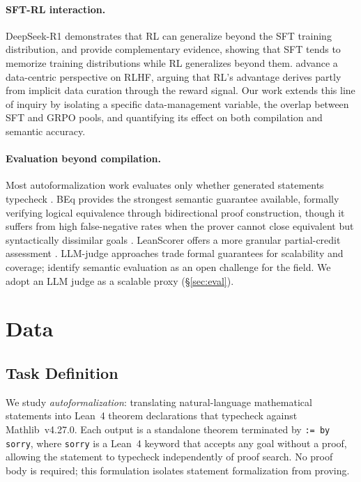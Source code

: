 \documentclass[11pt,a4paper]{article}
\begin{document}
\paragraph{SFT-RL interaction.}
DeepSeek-R1 \citep{guo2025deepseekr1} demonstrates that RL can generalize beyond the SFT training distribution, and \citet{chu2025sftmemorizes} provide complementary evidence, showing that SFT tends to memorize training distributions while RL generalizes beyond them. \citet{lu2026datacentric} advance a data-centric perspective on RLHF, arguing that RL's advantage derives partly from implicit data curation through the reward signal. Our work extends this line of inquiry by isolating a specific data-management variable, the overlap between SFT and GRPO pools, and quantifying its effect on both compilation and semantic accuracy.

\paragraph{Evaluation beyond compilation.}
Most autoformalization work evaluates only whether generated statements typecheck \citep{wang2025kimina, huang2025formalrl}. BEq provides the strongest semantic guarantee available, formally verifying logical equivalence through bidirectional proof construction, though it suffers from high false-negative rates when the prover cannot close equivalent but syntactically dissimilar goals \citep{wu2025stepfun, weng2025autoformalization}. LeanScorer offers a more granular partial-credit assessment \citep{zhang2025mathesis}. LLM-judge approaches trade formal guarantees for scalability and coverage; \citet{weng2025autoformalization} identify semantic evaluation as an open challenge for the field. We adopt an LLM judge as a scalable proxy (\S\ref{sec:eval}).

\section{Data}\label{sec:data}

\subsection{Task Definition}\label{sec:task}

We study \emph{autoformalization}: translating natural-language mathematical statements into Lean~4 theorem declarations that typecheck against Mathlib~v4.27.0. Each output is a standalone theorem terminated by \texttt{:= by sorry}, where \texttt{sorry} is a Lean~4 keyword that accepts any goal without a proof, allowing the statement to typecheck independently of proof search. No proof body is required; this formulation isolates statement formalization from proving.
\end{document}
